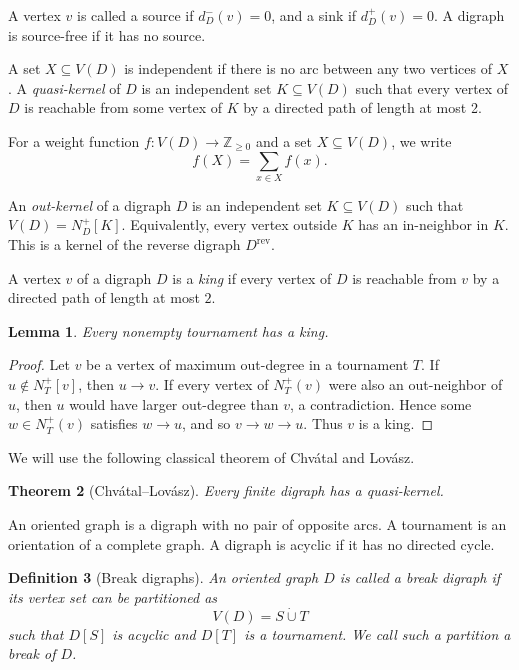 \documentclass[11pt,a4paper]{article}
\newtheorem{theorem}{Theorem}[section]
\newtheorem{lemma}[theorem]{Lemma}
\newtheorem{definition}[theorem]{Definition}
\begin{document}
A vertex \(v\) is called a source if \(d_D^-(v)=0\), and a sink if
\(d_D^+(v)=0\). A digraph is source-free if it has no source.

A set \(X\subseteq V(D)\) is independent if there is no arc between any two
vertices of \(X\). A \emph{quasi-kernel} of \(D\) is an independent set
\(K\subseteq V(D)\) such that every vertex of \(D\) is reachable from some
vertex of \(K\) by a directed path of length at most 2.

For a weight function \(f:V(D)\to \mathbb Z_{\ge0}\) and a set
\(X\subseteq V(D)\), we write
\[
    f(X)=\sum_{x\in X} f(x).
\]

An \emph{out-kernel} of a digraph \(D\) is an independent set \(K\subseteq V(D)\)
such that \(V(D)=N_D^+[K]\). Equivalently, every vertex outside \(K\) has an
in-neighbor in \(K\). This is a kernel of the reverse digraph \(D^{\mathrm{rev}}\).

A vertex \(v\) of a digraph \(D\) is a \emph{king} if every vertex of \(D\) is
reachable from \(v\) by a directed path of length at most \(2\).

\begin{lemma}\label{lem:tournament-king}
Every nonempty tournament has a king.
\end{lemma}

\begin{proof}
Let \(v\) be a vertex of maximum out-degree in a tournament \(T\). If
\(u\notin N_T^+[v]\), then \(u\to v\). If every vertex of \(N_T^+(v)\) were also
an out-neighbor of \(u\), then \(u\) would have larger out-degree than \(v\), a
contradiction. Hence some \(w\in N_T^+(v)\) satisfies \(w\to u\), and so
\(v\to w\to u\). Thus \(v\) is a king.
\end{proof}

We will use the following classical theorem of Chv\'atal and Lov\'asz.

\begin{theorem}[Chv\'atal--Lov\'asz]\label{thm:CL}
Every finite digraph has a quasi-kernel.
\end{theorem}

An oriented graph is a digraph with no pair of opposite arcs. A tournament is an
orientation of a complete graph. A digraph is acyclic if it has no directed
cycle.

\begin{definition}[Break digraphs]
An oriented graph \(D\) is called a \emph{break digraph} if its vertex set can
be partitioned as
\[
    V(D)=S\dot\cup T
\]
such that \(D[S]\) is acyclic and \(D[T]\) is a tournament. We call such a
partition a \emph{break} of \(D\).
\end{definition}
\end{document}
